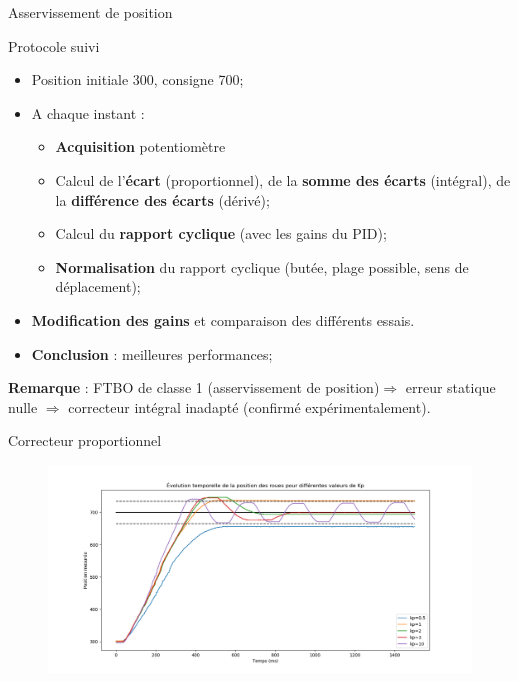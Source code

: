 \documentclass[french, handout]{beamer}
\begin{document}
            \begin{frame}{Asservissement de position}
            \begin{block}{Protocole suivi}
            \begin{itemize}
                \item Position initiale 300, consigne 700;
                \item A chaque instant : \begin{itemize}
                    \item \textbf{Acquisition} potentiomètre
                    \item Calcul de l'\textbf{écart} (proportionnel), de la \textbf{somme des écarts} (intégral), de la \textbf{différence des écarts} (dérivé);
                    \item Calcul du \textbf{rapport cyclique} (avec les gains du PID);
                    \item \textbf{Normalisation} du rapport cyclique (butée, plage possible, sens de déplacement);
                \end{itemize}
                \item \textbf{Modification des gains} et comparaison des différents essais.
                \item \textbf{Conclusion} : meilleures performances;
            \end{itemize}
            \textbf{Remarque} : FTBO de classe 1 (asservissement de position)$\Rightarrow$ erreur statique nulle $\Rightarrow$ correcteur intégral inadapté (confirmé expérimentalement).
            \end{block}
            \end{frame}
            
            \begin{frame}{Correcteur proportionnel}
                \begin{figure}
                    \centering
                \hspace*{-4.2em}
                    \includegraphics[width=14cm]{deter_kp.png}
                \end{figure}
            \end{frame}
            
\end{document}
